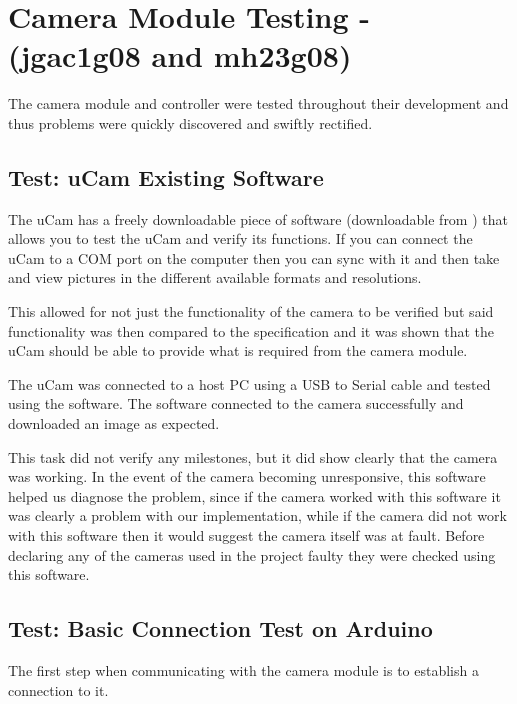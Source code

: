 \section{Camera Module Testing - (jgac1g08 and mh23g08)}

The camera module and controller were tested throughout their development and thus problems were quickly discovered and swiftly rectified.

\subsection{Test: uCam Existing Software}
\label{sec:existing_software_test}

The uCam has a freely downloadable piece of software (downloadable from \cite{ucam_test_software}) that allows you to test the uCam and verify its functions. If you can connect the uCam to a COM port on the computer then you can sync with it and then take and view pictures in the different available formats and resolutions.

This allowed for not just the functionality of the camera to be verified but said functionality was then compared to the specification and it was shown that the uCam should be able to provide what is required from the camera module.

The uCam was connected to a host PC using a USB to Serial cable and tested using the software. The software connected to the camera successfully and downloaded an image as expected.

This task did not verify any milestones, but it did show clearly that the camera was working. In the event of the camera becoming unresponsive, this software helped us diagnose the problem, since if the camera worked with this software it was clearly a problem with our implementation, while if the camera did not work with this software then it would suggest the camera itself was at fault. Before declaring any of the cameras used in the project faulty they were checked using this software.

\subsection{Test: Basic Connection Test on Arduino}
\label{sec:basic_connection_test}

The first step when communicating with the camera module is to establish a connection to it.

